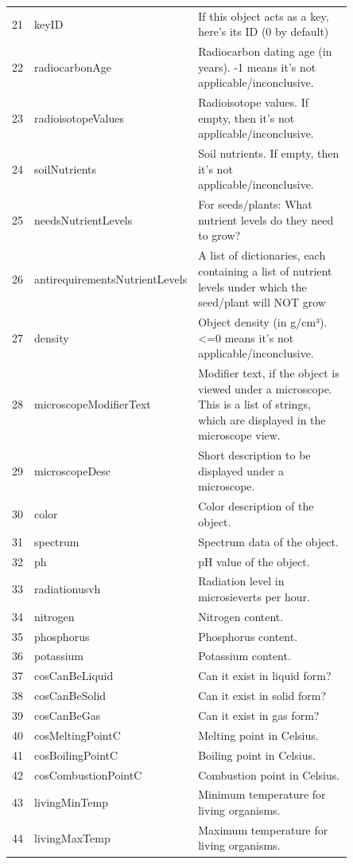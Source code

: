 \begin{table}[t!]
\begin{tabular}{cp{0.20\linewidth}p{0.65\linewidth}}
21 & keyID & If this object acts as a key, here's its ID (0 by default) \\
22 & radiocarbonAge & Radiocarbon dating age (in years). -1 means it's not applicable/inconclusive. \\
23 & radioisotopeValues & Radioisotope values. If empty, then it's not applicable/inconclusive. \\
24 & soilNutrients & Soil nutrients. If empty, then it's not applicable/inconclusive. \\
25 & needsNutrientLevels & For seeds/plants: What nutrient levels do they need to grow? \\
26 & antirequirementsNutrientLevels & A list of dictionaries, each containing a list of nutrient levels under which the seed/plant will NOT grow \\
27 & density & Object density (in g/cm³). <=0 means it's not applicable/inconclusive. \\
28 & microscopeModifierText & Modifier text, if the object is viewed under a microscope. This is a list of strings, which are displayed in the microscope view. \\
29 & microscopeDesc & Short description to be displayed under a microscope. \\
30 & color & Color description of the object. \\
31 & spectrum & Spectrum data of the object. \\
32 & ph & pH value of the object. \\
33 & radiationusvh & Radiation level in microsieverts per hour. \\
34 & nitrogen & Nitrogen content. \\
35 & phosphorus & Phosphorus content. \\
36 & potassium & Potassium content. \\
37 & cosCanBeLiquid & Can it exist in liquid form? \\
38 & cosCanBeSolid & Can it exist in solid form? \\
39 & cosCanBeGas & Can it exist in gas form? \\
40 & cosMeltingPointC & Melting point in Celsius. \\
41 & cosBoilingPointC & Boiling point in Celsius. \\
42 & cosCombustionPointC & Combustion point in Celsius. \\
43 & livingMinTemp & Minimum temperature for living organisms. \\
44 & livingMaxTemp & Maximum temperature for living organisms. \\

\end{tabular}
\end{table}
